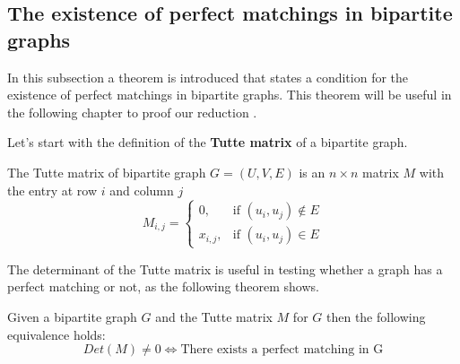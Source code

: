 \subsection{The existence of perfect matchings in bipartite graphs}
In this subsection a theorem is introduced that states a condition for the existence of perfect matchings in bipartite graphs. This theorem will be useful in the following chapter to proof our reduction \cite{viswanath2004perfect}.

Let's start with the definition of the \textbf{Tutte matrix} of a bipartite graph.
\begin{definition} \label{def:tutte_matrix}
    The Tutte matrix of bipartite graph $G = (U, V, E)$ is an $n \times n$ matrix $M$ with the entry at row $i$ and column $j$
    \begin{equation}
        M_{i,j} =
        \begin{cases}
            0, & \text{if } (u_i, u_j) \notin E \\
            x_{i,j}, & \text{if } (u_i, u_j) \in E
        \end{cases}
    \end{equation}
\end{definition}

The determinant of the Tutte matrix is useful in testing whether a graph has a perfect matching or not, as the following theorem shows. 

\begin{theorem} \label {thm:perfect_matching_existence}
    Given a bipartite graph $G$ and the Tutte matrix $M$ for $G$ then the following equivalence holds:
    $$
    Det(M) \neq 0 \iff \text{There exists a perfect matching in G}
    $$
\end{theorem}


